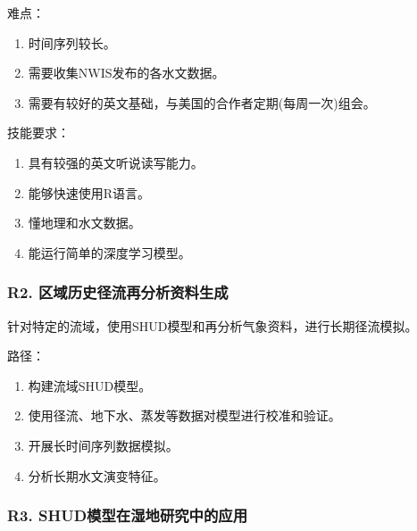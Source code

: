 \documentclass[
]{book}
\providecommand{\tightlist}{%
  \setlength{\itemsep}{0pt}\setlength{\parskip}{0pt}}
\begin{document}
难点：

\begin{enumerate}
\def\labelenumi{\arabic{enumi}.}
\tightlist
\item
  时间序列较长。
\item
  需要收集NWIS发布的各水文数据。
\item
  需要有较好的英文基础，与美国的合作者定期(每周一次)组会。
\end{enumerate}

技能要求：

\begin{enumerate}
\def\labelenumi{\arabic{enumi}.}
\tightlist
\item
  具有较强的英文听说读写能力。
\item
  能够快速使用R语言。
\item
  懂地理和水文数据。
\item
  能运行简单的深度学习模型。
\end{enumerate}

\hypertarget{r2.-ux533aux57dfux5386ux53f2ux5f84ux6d41ux518dux5206ux6790ux8d44ux6599ux751fux6210}{%
\subsubsection{\texorpdfstring{\textbf{R2. 区域历史径流再分析资料生成}}{R2. 区域历史径流再分析资料生成}}\label{r2.-ux533aux57dfux5386ux53f2ux5f84ux6d41ux518dux5206ux6790ux8d44ux6599ux751fux6210}}

针对特定的流域，使用SHUD模型和再分析气象资料，进行长期径流模拟。

路径：

\begin{enumerate}
\def\labelenumi{\arabic{enumi}.}
\tightlist
\item
  构建流域SHUD模型。
\item
  使用径流、地下水、蒸发等数据对模型进行校准和验证。
\item
  开展长时间序列数据模拟。
\item
  分析长期水文演变特征。
\end{enumerate}

\hypertarget{r3.-shudux6a21ux578bux5728ux6e7fux5730ux7814ux7a76ux4e2dux7684ux5e94ux7528}{%
\subsubsection{\texorpdfstring{\textbf{R3. SHUD模型在湿地研究中的应用}}{R3. SHUD模型在湿地研究中的应用}}\label{r3.-shudux6a21ux578bux5728ux6e7fux5730ux7814ux7a76ux4e2dux7684ux5e94ux7528}}
\end{document}
